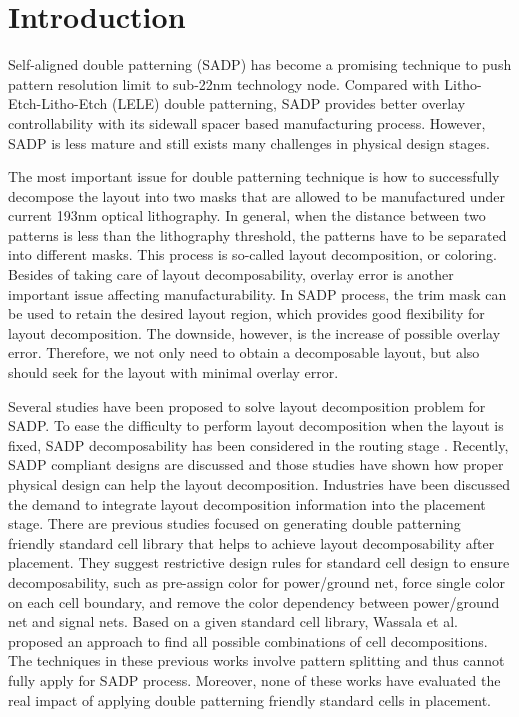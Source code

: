\section{Introduction}
Self-aligned double patterning (SADP) has become a promising technique to push pattern resolution limit to sub-22nm technology node. Compared with Litho-Etch-Litho-Etch (LELE) double patterning, SADP provides better overlay controllability with its sidewall spacer based manufacturing process. However, SADP is less mature and still exists many challenges in physical design stages. 

The most important issue for double patterning technique is how to successfully decompose the layout into two masks that are allowed to be manufactured under current 193nm optical lithography. In general, when the distance between two patterns is less than the lithography threshold, the patterns have to be separated into different masks. This process is so-called layout decomposition, or coloring. Besides of taking care of layout decomposability, overlay error is another important issue affecting manufacturability. In SADP process, the trim mask can be used to retain the desired layout region, which provides good flexibility for layout decomposition. The downside, however, is the increase of possible overlay error. Therefore, we not only need to obtain a decomposable layout, but also should seek for the layout with minimal overlay error.

Several studies \cite{yongchan_ban_flexible_2011, zhang_self-aligned_2011, xiao_polynomial_2012} have been proposed to solve layout decomposition problem for SADP. To ease the difficulty to perform layout decomposition when the layout is fixed, SADP decomposability has been considered in the routing stage \cite{mirsaeedi_self-aligned_2011, gao_flexible_2012, kodama_aspdac13}. Recently, SADP compliant designs are discussed \cite{luk-pat_design_2012, ma_self-aligned_2012} and those studies have shown how proper physical design can help the layout decomposition. Industries have been discussed the demand to integrate layout decomposition information into the placement stage. There are previous studies \cite{hsu_tcad_2011, Liebmann_spie11} focused on generating double patterning friendly standard cell library that helps to achieve layout decomposability after placement. They suggest restrictive design rules for standard cell design to ensure decomposability, such as pre-assign color for power/ground net, force single color on each cell boundary, and remove the color dependency between power/ground net and signal nets. Based on a given standard cell library, Wassala et al. \cite{Wassala_spie12} proposed an approach to find all possible combinations of cell decompositions. The techniques in these previous works involve pattern splitting and thus cannot fully apply for SADP process. Moreover, none of these works have evaluated the real impact of applying  double patterning friendly standard cells in placement.

